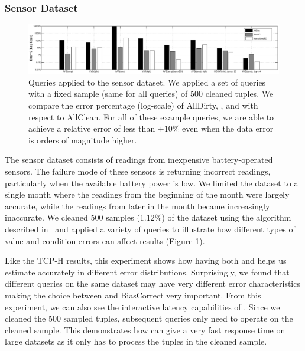 \subsubsection{Sensor Dataset}
\begin{figure}[t]\vspace{-2.5em}
\hspace{-60pt}
\includegraphics[scale=0.375]{exp/sensor-all-queries.eps}\vspace{-1em}
\caption{Queries applied to the sensor dataset. We applied a set of queries with a fixed sample (same for all queries) of 500 cleaned tuples. We compare the error percentage (log-scale) of AllDirty, \sampleclean, and \bias with respect to AllClean.
 For all of these example queries, we are able to achieve a relative error of less than $\pm 10\%$ even when the data error is orders of magnitude higher.}\vspace{-1em}
\label{exp:sensor-all-queries}
\end{figure}
The sensor dataset consists of readings from inexpensive battery-operated sensors.
The failure mode of these sensors is returning incorrect readings, particularly when the available battery power is low.
We limited the dataset to a single month where the readings from the beginning of the month were largely accurate, while the readings from later in the month became increasingly inaccurate.
We cleaned 500 samples (1.12\%) of the dataset using the algorithm described in~\cite{DBLP:conf/pervasive/JefferyAFHW06} and applied a variety of queries to illustrate how different types of value and condition errors can affect results (Figure \ref{exp:sensor-all-queries}).

Like the TCP-H results, this experiment shows how having both \sampleclean and \bias helps us estimate accurately in different error distributions.
Surprisingly, we found that different queries on the same dataset may have very different error characteristics making the choice between \sampleclean and BiasCorrect very important.
From this experiment, we can also see the interactive latency capabilities of \saqpplus.
Since we cleaned the 500 sampled tuples, subsequent \sampleclean queries only need to operate on the cleaned sample.
This demonstrates how \sampleclean can give a very fast response time on large datasets as it only has to process the tuples in the cleaned sample.

